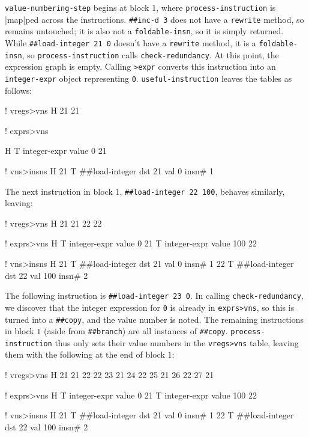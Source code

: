\Verb|value-numbering-step| begins at block $1$, where
\Verb|process-instruction| is \factor|map|ped across the instructions.
%
\Verb|##inc-d 3|
%
does not have a \Verb|rewrite| method, so remains untouched; it is also not a
\Verb|foldable-insn|, so it is simply returned.  While
%
\Verb|##load-integer 21 0|
%
doesn't have a \Verb|rewrite| method, it is a \Verb|foldable-insn|, so
\Verb|process-instruction| calls \Verb|check-redundancy|.  At this point,
the expression graph is empty.  Calling \Verb|>expr| converts this
instruction into an \Verb|integer-expr| object representing \Verb|0|.
\Verb|useful-instruction| leaves the tables as follows:
%
  \begin{factorcode}
    ! vregs>vns
    H{ { 21 21 } }

    ! exprs>vns

    H{ { T{ integer-expr { value 0 } } 21 } }

    ! vns>insns
    H{
        { 21 T{ ##load-integer { dst 21 } { val 0 } { insn# 1 } } }
    }
  \end{factorcode}
%
\noindent The next instruction in block $1$,
%
\Verb|##load-integer 22 100|,
%
behaves similarly, leaving:
%
  \begin{factorcode}
    ! vregs>vns
    H{ { 21 21 } { 22 22 } }

    ! exprs>vns
    H{
        { T{ integer-expr { value 0 } } 21 }
        { T{ integer-expr { value 100 } } 22 }
    }

    ! vns>insns
    H{
        { 21 T{ ##load-integer { dst 21 } { val 0 } { insn# 1 } } }
        {
            22
            T{ ##load-integer { dst 22 } { val 100 } { insn# 2 } }
        }
    }
  \end{factorcode}
%
\noindent The following instruction is
%
\Verb|##load-integer 23 0|.
%
In calling \Verb|check-redundancy|, we discover that the integer expression
for \Verb|0| is already in \Verb|exprs>vns|, so this is turned into a
\Verb|##copy|, and the value number is noted.  The remaining instructions in
block $1$ (aside from \Verb|##branch|) are all instances of \Verb|##copy|.
\Verb|process-instruction| thus only sets their value numbers in the
\Verb|vregs>vns| table, leaving them with the following at the end of block
$1$:
%
  \begin{factorcode}
    ! vregs>vns
    H{
        { 21 21 }
        { 22 22 }
        { 23 21 }
        { 24 22 }
        { 25 21 }
        { 26 22 }
        { 27 21 }
    }

    ! exprs>vns
    H{
        { T{ integer-expr { value 0 } } 21 }
        { T{ integer-expr { value 100 } } 22 }
    }

    ! vns>insns
    H{
        { 21 T{ ##load-integer { dst 21 } { val 0 } { insn# 1 } } }
        {
            22
            T{ ##load-integer { dst 22 } { val 100 } { insn# 2 } }
        }
    }
  \end{factorcode}


